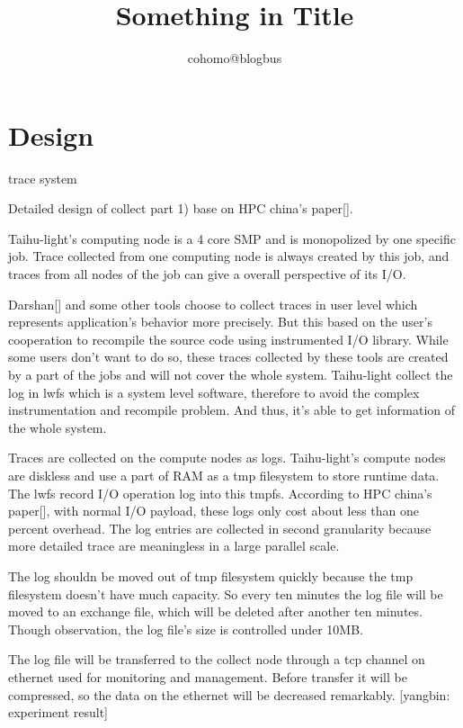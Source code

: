 \documentclass{article}
\begin{document}
\title{Something in Title}

\author{cohomo@blogbus}

\date{}

\maketitle

\fi

\section{Design}

\label{sec:design}

trace system

Detailed design of collect part 1)
base on HPC china's paper[].

Taihu-light's computing node is a 4 core SMP and is monopolized by one specific job. Trace collected from one computing node is always created by this job, and traces from all nodes of the job can give a overall perspective of its I/O.

Darshan[] and some other tools choose to collect traces in user level which represents application's behavior more precisely. But this based on the user's cooperation to recompile the source code using instrumented I/O library. While some users don't want to do so, these traces collected by these tools are created by a part of the jobs and will not cover the whole system. Taihu-light collect the log in lwfs which is a system level software, therefore to avoid the complex instrumentation and recompile problem. And thus, it's able to get information of the whole system.

Traces are collected on the compute nodes as logs. Taihu-light's compute nodes are diskless and use a part of RAM as a tmp filesystem to store runtime data. The lwfs record I/O operation log into this tmpfs. According to HPC china's paper[], with normal I/O payload, these logs only cost about less than one percent overhead. The log entries are collected in second granularity because more detailed trace are meaningless in a large parallel scale.

The log shouldn be moved out of tmp filesystem quickly because the tmp filesystem doesn't have much capacity. So every ten minutes the log file will be moved to an exchange file, which will be deleted after another ten minutes. Though observation, the log file's size is controlled under 10MB.

The log file will be transferred to the collect node through a tcp channel on ethernet used for monitoring and management.  Before transfer it will be compressed, so the data on the ethernet will be decreased remarkably.  [yangbin: experiment result]
\end{document}

